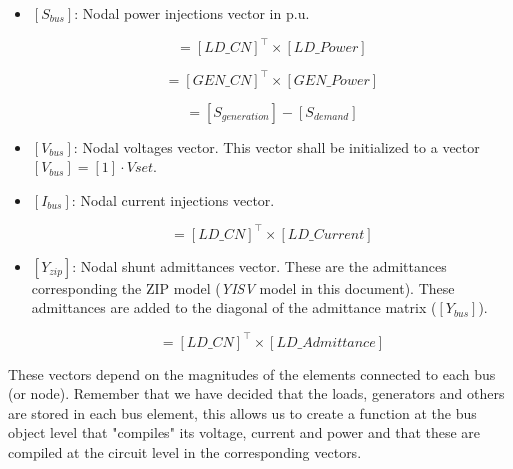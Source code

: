 \documentclass[nols,a4paper,twoside,notoc,fleqn]{tufte-book}
\begin{document}
\begin{itemize}
	\item $[S_{bus}]$: Nodal power injections vector in p.u.
	
	\begin{equation}
	[S_{demand}] = [LD\_CN]^\top \times [LD\_Power]
	\end{equation}
	
	
	\begin{equation}
	[S_{generation}] = [GEN\_CN]^\top \times [GEN\_Power]
	\end{equation}
	
	
	\begin{equation}
	[S_{bus}] = [S_{generation}] - [S_{demand}]
	\end{equation}
	
	
	\item $[V_{bus}]$: Nodal voltages vector. This vector shall be initialized to a vector $[V_{bus}] = [1] \cdot Vset$.
	
	\item $[I_{bus}]$:  Nodal current injections vector.
	
	\begin{equation}
	[I_{bus}] = [LD\_CN]^\top \times [LD\_Current]
	\end{equation}
	
	
	
	\item $[Y_{zip}]$:  Nodal shunt admittances vector. These are the admittances corresponding the ZIP model (\textit{YISV} model in this document). These admittances are added to the diagonal of the admittance matrix ($[Y_{bus}]$).
	
	\begin{equation}
	[Y_{zip} ]= [LD\_CN]^\top \times [LD\_Admittance]
	\end{equation}
\end{itemize}


These vectors depend on the magnitudes of the elements connected to each bus (or node). Remember that we have decided that the loads, generators and others are stored in each bus element, this allows us to create a function at the bus object level that "compiles" its voltage, current and power and that these are compiled at the circuit level in the corresponding vectors.
\end{document}
